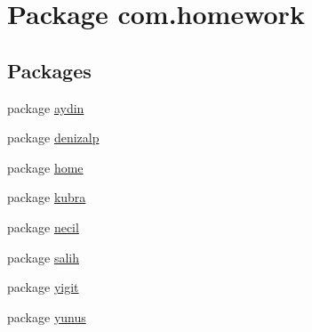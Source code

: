 \hypertarget{namespacecom_1_1homework}{}\section{Package com.\+homework}
\label{namespacecom_1_1homework}
\subsection*{Packages}
\begin{DoxyCompactItemize}
\item 
package \hyperlink{namespacecom_1_1homework_1_1aydin}{aydin}
\item 
package \hyperlink{namespacecom_1_1homework_1_1denizalp}{denizalp}
\item 
package \hyperlink{namespacecom_1_1homework_1_1home}{home}
\item 
package \hyperlink{namespacecom_1_1homework_1_1kubra}{kubra}
\item 
package \hyperlink{namespacecom_1_1homework_1_1necil}{necil}
\item 
package \hyperlink{namespacecom_1_1homework_1_1salih}{salih}
\item 
package \hyperlink{namespacecom_1_1homework_1_1yigit}{yigit}
\item 
package \hyperlink{namespacecom_1_1homework_1_1yunus}{yunus}
\end{DoxyCompactItemize}
